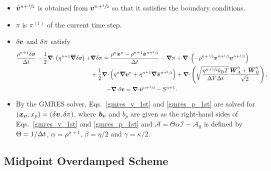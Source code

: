 \documentclass[
10pt
showpacs, showkeys,
amsmath,amssymb,
aps,
pre,
floatfix,
]{revtex4-1}
\newcommand{\divg}{{\V\nabla\cdot}}                       %
\newcommand{\paren}[1]{{(#1)}}                            %
\begin{document}
\begin{enumerate}
\begin{itemize}
\item $\bar{\boldsymbol{v}}^{n+\sfrac{1}{2}}$ is obtained from $\boldsymbol{v}^{n+\sfrac{1}{2}}$ so that it satisfies the boundary conditions.
\item $\pi$ is $\pi^\paren{1}$ of the current time step.
\item $\delta\boldsymbol{v}$ and $\delta\pi$ satisfy
\begin{gather}
\label{gmres_v_2nd}
\begin{split}
\frac{\rho^{n+1}\d{\V{v}}}{\D{t}} - \frac{1}{2}\divg\left(\eta^{n+1}\overline{\grad}\d{\V{v}}\right) + & \grad\d{\pi}
= \frac{\rho^n\V{v}^n-\rho^{n+1}\bar{\V{v}}^{n+\myhalf}}{\D{t}} - \grad\pi 
+ \divg\left(-\rho^{n+\myhalf}\V{v}^{n+\myhalf}\V{v}^{n+\myhalf}\right) \\
& + \frac{1}{2}\divg\left( \eta^n \overline{\grad}\V{v}^n + \eta^{n+1} \overline{\grad}\bar{\V{v}}^{n+\myhalf} \right)
+ \divg\left( \sqrt{\frac{\eta^{n+\myhalf} k_\mathrm{B}T}{\D{V}\D{t}} } \frac{\overline{\V{W}}^n_A + \overline{\V{W}}^n_B}{\sqrt{2}} \right),
\end{split} \\
\label{gmres_p_2nd}
-\divg\d{\V{v}} = \divg\bar{\V{v}}^{n+\myhalf}-S^{n+1}.
\end{gather}
\item By the GMRES solver, Eqs.~\eqref{gmres_v_1st} and \eqref{gmres_p_1st} are solved for $(\boldsymbol{x}_{\boldsymbol{v}},x_p)=(\delta\boldsymbol{v},\delta\pi)$, where $\boldsymbol{b}_{\boldsymbol{v}}$ and $b_p$ are given as the right-hand sides of Eqs.~\eqref{gmres_v_1st} and \eqref{gmres_p_1st} and 
$\mathcal{A}=\Theta\alpha\mathcal{I}-\mathcal{A}_0$ is defined by $\Theta=1/\Delta t$, $\alpha=\rho^{n+1}$, $\beta=\eta/2$ and $\gamma=\kappa/2$.
\end{itemize}

\end{enumerate}



\clearpage

\subsection{Midpoint Overdamped Scheme}
\end{document}
